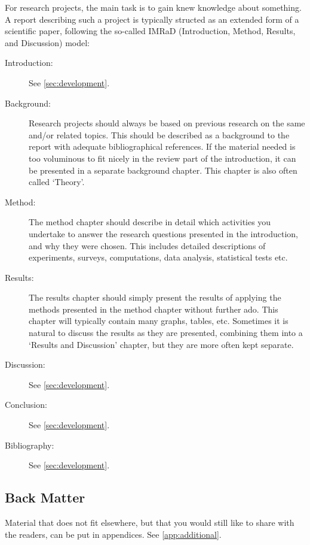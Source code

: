 For research projects, the main task is to gain knew knowledge about something. A report describing such a project is typically structed as an extended form of a scientific paper, following the so-called IMRaD (Introduction, Method, Results, and Discussion) model:

\begin{description}
    \item[Introduction:] See \cref{sec:development}.
    \item[Background:] Research projects should always be based on previous research on the same and/or related topics. This should be described as a background to the report with adequate bibliographical references. If the material needed is too voluminous to fit nicely in the review part of the introduction, it can be presented in a separate background chapter. This chapter is also often called `Theory'.
    \item[Method:] The method chapter should describe in detail which activities you undertake to answer the research questions presented in the introduction, and why they were chosen. This includes detailed descriptions of experiments, surveys, computations, data analysis, statistical tests etc.
    \item[Results:] The results chapter should simply present the results of applying the methods presented in the method chapter without further ado. This chapter will typically contain many graphs, tables, etc. Sometimes it is natural to discuss the results as they are presented, combining them into a `Results and Discussion' chapter, but they are more often kept separate.
    \item[Discussion:] See \cref{sec:development}.
    \item[Conclusion:] See \cref{sec:development}.
    \item[Bibliography:] See \cref{sec:development}.
\end{description}

\subsection{Back Matter}

Material that does not fit elsewhere, but that you would still like to share with the readers, can be put in appendices. See \cref{app:additional}.
